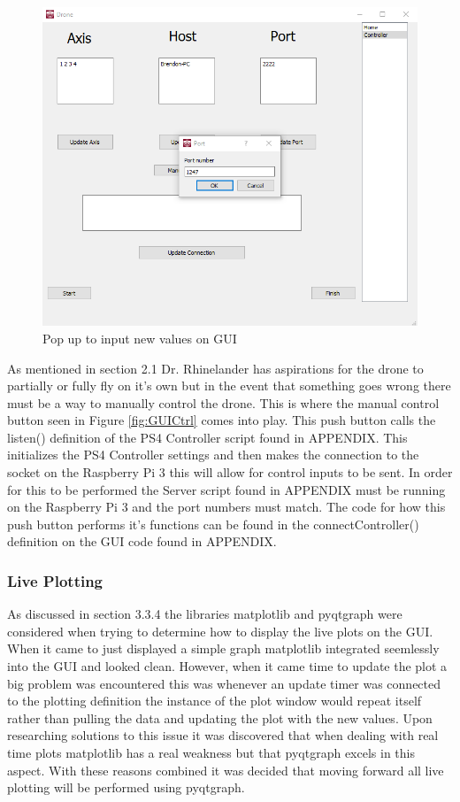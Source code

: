 \begin{figure}[H]
	\includegraphics[width=\linewidth]{GUIPopup.png}
	\caption{Pop up to input new values on GUI}
	\label{fig:popup}
\end{figure}

As mentioned in section 2.1 Dr. Rhinelander has aspirations for the drone to partially or fully fly on it's own but in the event that something goes wrong there must be a way to manually control the drone. This is where the manual control button seen in Figure \ref{fig:GUICtrl} comes into play. This push button calls the listen() definition of the PS4 Controller script found in APPENDIX. This initializes the PS4 Controller settings and then makes the connection to the socket on the Raspberry Pi 3 this will allow for control inputs to be sent. In order for this to be performed the Server script found in APPENDIX must be running on the Raspberry Pi 3 and the port numbers must match. The code for how this push button performs it's functions can be found in the connectController() definition on the GUI code found in APPENDIX.

\subsubsection{Live Plotting}
As discussed in section 3.3.4 the libraries matplotlib and pyqtgraph were considered when trying to determine how to display the live plots on the GUI. When it came to just displayed a simple graph matplotlib integrated seemlessly into the GUI and looked clean. However, when it came time to update the plot a big problem was encountered this was whenever an update timer was connected to the plotting definition the instance of the plot window would repeat itself rather than pulling the data and updating the plot with the new values. Upon researching solutions to this issue it was discovered that when dealing with real time plots matplotlib has a real weakness but that pyqtgraph excels in this aspect. With these reasons combined it was decided that moving forward all live plotting will be performed using pyqtgraph.

